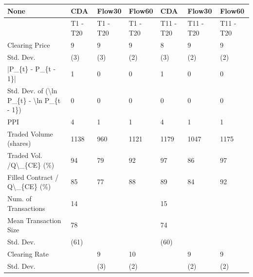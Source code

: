 \begin{tabular}{lllllll}
\hline
 None                                                      & CDA      & Flow30   & Flow60   & CDA       & Flow30    & Flow60    \\
\hline
                                                           & T1 - T20 & T1 - T20 & T1 - T20 & T11 - T20 & T11 - T20 & T11 - T20 \\
 Clearing Price                                            & 9        & 9        & 9        & 8         & 9         & 9         \\
 Std. Dev.                                                 & (3)      & (3)      & (2)      & (3)       & (2)       & (2)       \\
 |P\_\{t\} - P\_\{t - 1\}|                                       & 1        & 0        & 0        & 1         & 0         & 0         \\
 Std. Dev. of (\textbackslash{}ln P\_\{t\} - \textbackslash{}ln P\_\{t - 1\})                  & 0        & 0        & 0        & 0         & 0         & 0         \\
 PPI                                                       & 4        & 1        & 1        & 4         & 1         & 1         \\
 Traded Volume (shares)                                    & 1138     & 960      & 1121     & 1179      & 1047      & 1175      \\
 Traded Vol. /Q\textbackslash{}\_\{CE\} (\%)                                  & 94       & 79       & 92       & 97        & 86        & 97        \\
 Filled Contract / Q\textbackslash{}\_\{CE\} (\%)                             & 85       & 77       & 88       & 89        & 84        & 92        \\
 Num. of Transactions                                      & 14       &          &          & 15        &           &           \\
 Mean Transaction Size                                     & 78       &          &          & 74        &           &           \\
 Std. Dev.                                                 & (61)     &          &          & (60)      &           &           \\
 Clearing Rate                                             &          & 9        & 10       &           & 9         & 9         \\
 Std. Dev.                                                 &          & (3)      & (2)      &           & (2)       & (2)       \\

\end{tabular}
